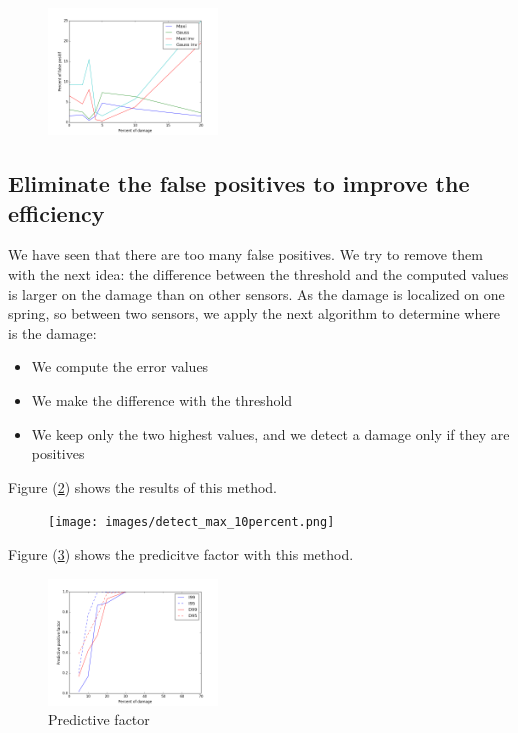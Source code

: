 \documentclass[journal]{IEEEtran}
\begin{document}
\begin{figure}[h!]
  \centering
  \includegraphics[width=0.4\textwidth]{images/fp_noise005.png}
  \caption{}
  \label{fp_5noise}
\end{figure}


\subsection{Eliminate the false positives to improve the efficiency}

We have seen that there are too many false positives. We try to remove them with the next idea: the difference between the threshold and the computed values is larger on the damage than on other sensors. As the damage is localized on one spring, so between two sensors, we apply the next algorithm to determine where is the damage:
\begin{itemize}
\item We compute the error values
\item We make the difference with the threshold
\item We keep only the two highest values, and we detect a damage only if they are positives
\end{itemize}

Figure (\ref{detect_max}) shows the results of this method.

\begin{figure}[h!]
  \centering
  \texttt{[image: images/detect\_max\_10percent.png]}
  \caption{}
  \label{detect_max}
\end{figure}


Figure (\ref{pred_max}) shows the predicitve factor with this method.

\begin{figure}[h!]
  \centering
  \includegraphics[width=0.4\textwidth]{images/pred_max.png}
  \caption{Predictive factor}
  \label{pred_max}
\end{figure}
\end{document}
